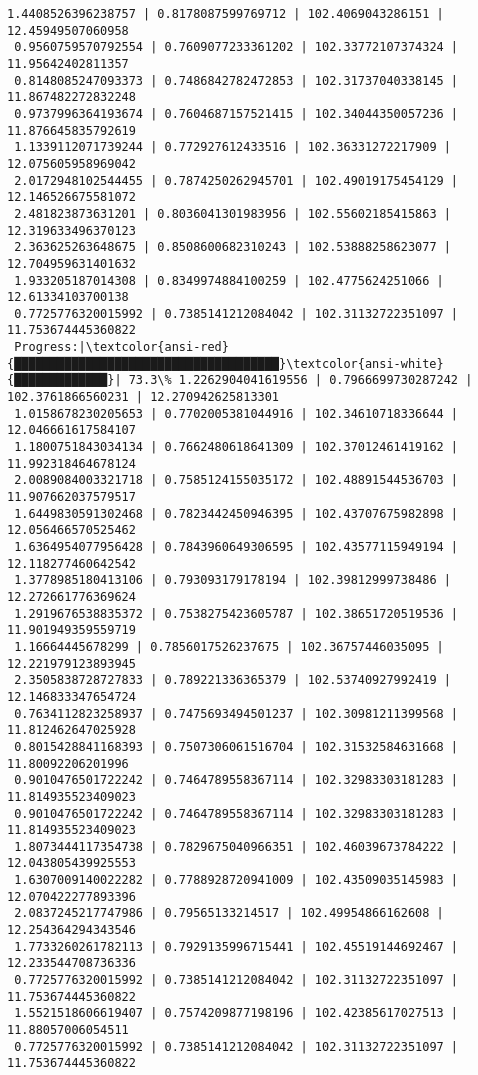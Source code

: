 \documentclass[11pt]{article}
\begin{document}
\begin{Verbatim}[commandchars=\\\{\}]
 1.4408526396238757 | 0.8178087599769712 | 102.4069043286151 | 12.45949507060958
 0.9560759570792554 | 0.7609077233361202 | 102.33772107374324 | 11.95642402811357
 0.8148085247093373 | 0.7486842782472853 | 102.31737040338145 | 11.867482272832248
 0.9737996364193674 | 0.7604687157521415 | 102.34044350057236 | 11.876645835792619
 1.1339112071739244 | 0.772927612433516 | 102.36331272217909 | 12.075605958969042
 2.0172948102544455 | 0.7874250262945701 | 102.49019175454129 | 12.146526675581072
 2.481823873631201 | 0.8036041301983956 | 102.55602185415863 | 12.319633496370123
 2.363625263648675 | 0.8508600682310243 | 102.53888258623077 | 12.704959631401632
 1.933205187014308 | 0.8349974884100259 | 102.4775624251066 | 12.61334103700138
 0.7725776320015992 | 0.7385141212084042 | 102.31132722351097 | 11.753674445360822
 Progress:|\textcolor{ansi-red}{█████████████████████████████████████}\textcolor{ansi-white}{█████████████}| 73.3\% 1.2262904041619556 | 0.7966699730287242 | 102.3761866560231 | 12.270942625813301
 1.0158678230205653 | 0.7702005381044916 | 102.34610718336644 | 12.046661617584107
 1.1800751843034134 | 0.7662480618641309 | 102.37012461419162 | 11.992318464678124
 2.0089084003321718 | 0.7585124155035172 | 102.48891544536703 | 11.907662037579517
 1.6449830591302468 | 0.7823442450946395 | 102.43707675982898 | 12.056466570525462
 1.6364954077956428 | 0.7843960649306595 | 102.43577115949194 | 12.118277460642542
 1.3778985180413106 | 0.793093179178194 | 102.39812999738486 | 12.272661776369624
 1.2919676538835372 | 0.7538275423605787 | 102.38651720519536 | 11.901949359559719
 1.16664445678299 | 0.7856017526237675 | 102.36757446035095 | 12.221979123893945
 2.3505838728727833 | 0.789221336365379 | 102.53740927992419 | 12.146833347654724
 0.7634112823258937 | 0.7475693494501237 | 102.30981211399568 | 11.812462647025928
 0.8015428841168393 | 0.7507306061516704 | 102.31532584631668 | 11.80092206201996
 0.9010476501722242 | 0.7464789558367114 | 102.32983303181283 | 11.814935523409023
 0.9010476501722242 | 0.7464789558367114 | 102.32983303181283 | 11.814935523409023
 1.8073444117354738 | 0.7829675040966351 | 102.46039673784222 | 12.043805439925553
 1.6307009140022282 | 0.7788928720941009 | 102.43509035145983 | 12.070422277893396
 2.0837245217747986 | 0.79565133214517 | 102.49954866162608 | 12.254364294343546
 1.7733260261782113 | 0.7929135996715441 | 102.45519144692467 | 12.233544708736336
 0.7725776320015992 | 0.7385141212084042 | 102.31132722351097 | 11.753674445360822
 1.5521518606619407 | 0.7574209877198196 | 102.42385617027513 | 11.88057006054511
 0.7725776320015992 | 0.7385141212084042 | 102.31132722351097 | 11.753674445360822

\end{Verbatim}
\end{document}
